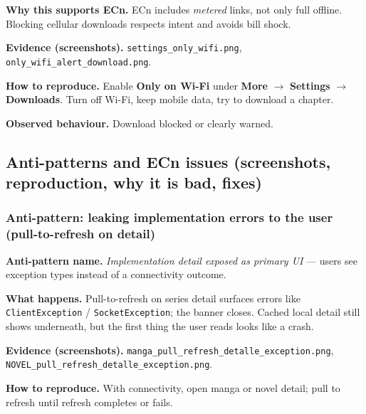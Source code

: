 \textbf{Why this supports ECn.} ECn includes \emph{metered} links, not only full offline. Blocking cellular downloads respects intent and avoids bill shock.

\textbf{Evidence (screenshots).} \texttt{settings\_only\_wifi.png}, \texttt{only\_wifi\_alert\_download.png}.


\textbf{How to reproduce.} Enable \textbf{Only on Wi-Fi} under \textbf{More} $\rightarrow$ \textbf{Settings} $\rightarrow$ \textbf{Downloads}. Turn off Wi-Fi, keep mobile data, try to download a chapter.

\textbf{Observed behaviour.} Download blocked or clearly warned.

\subsection{Anti-patterns and ECn issues (screenshots, reproduction, why it is bad, fixes)}
\label{sec:ecn-antipatterns}

\subsubsection{Anti-pattern: leaking implementation errors to the user (pull-to-refresh on detail)}
\label{sec:ecn-ap-pull}
\textbf{Anti-pattern name.} \emph{Implementation detail exposed as primary UI} --- users see exception types instead of a connectivity outcome.

\textbf{What happens.} Pull-to-refresh on series detail surfaces errors like \texttt{ClientException} / \texttt{SocketException}; the banner closes. Cached local detail still shows underneath, but the first thing the user reads looks like a crash.

\textbf{Evidence (screenshots).} \texttt{manga\_pull\_refresh\_detalle\_exception.png}, \texttt{NOVEL\_pull\_refresh\_detalle\_exception.png}.


\textbf{How to reproduce.} With connectivity, open manga or novel detail; pull to refresh until refresh completes or fails.

